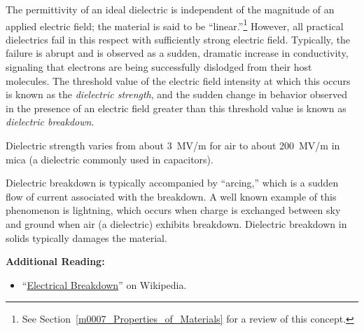 

\label{m0109_Dielectric_Breakdown} %

The permittivity 
of an ideal dielectric is independent of the magnitude of an applied electric field; the material is said to be ``linear.''\footnote{See Section~\ref{m0007_Properties_of_Materials} for a review of this concept.}
However, all practical dielectrics fail in this respect with sufficiently strong electric field.
Typically, the failure is abrupt and is observed as a sudden, dramatic increase in conductivity, signaling that electrons are being successfully dislodged from their host molecules.
The threshold value of the electric field intensity at which this occurs is known as the \emph{dielectric strength}, 
and the sudden change in behavior observed in the presence of an electric field greater than this threshold value is known as \emph{dielectric breakdown}.

Dielectric strength varies from about 3~MV/m for air to about 200~MV/m in mica 
(a dielectric commonly used in capacitors).

Dielectric breakdown is typically accompanied by ``arcing,'' 
which is a sudden flow of current associated with the breakdown.
A well known example of this phenomenon is lightning, 
which occurs when charge is exchanged between sky and ground when air
(a dielectric) exhibits breakdown.
Dielectric breakdown in solids typically damages the material. 

{\bf Additional Reading:}
\begin{itemize}
\item ``\href{https://en.wikipedia.org/wiki/Electrical_breakdown}{Electrical Breakdown}'' on Wikipedia.
\end{itemize}



